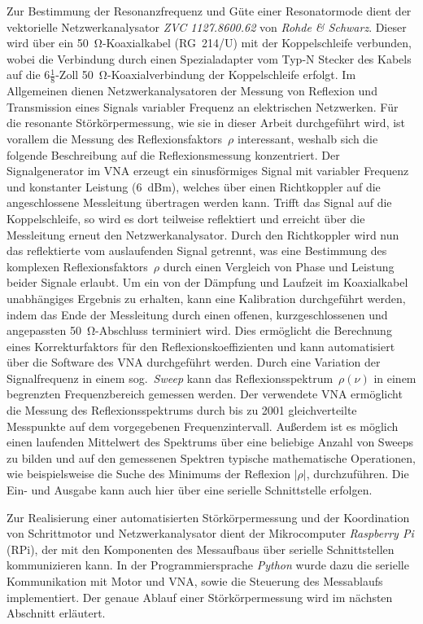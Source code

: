 Zur Bestimmung der Resonanzfrequenz und Güte einer Resonatormode dient der vektorielle Netzwerkanalysator \textit{ZVC 1127.8600.62} von \textit{Rohde \& Schwarz}.
Dieser wird über ein \SI{50}{\ohm}-Koaxialkabel (RG~214/U) mit der Koppelschleife verbunden, wobei die Verbindung durch einen Spezialadapter vom Typ-N Stecker des Kabels auf die $6\tfrac{1}{8}$-Zoll \SI{50}{\ohm}-Koaxialverbindung der Koppelschleife erfolgt.
Im Allgemeinen dienen Netzwerkanalysatoren der Messung von Reflexion und Transmission eines Signals variabler Frequenz an elektrischen Netzwerken.
Für die resonante Störkörpermessung, wie sie in dieser Arbeit durchgeführt wird, ist vorallem die Messung des Reflexionsfaktors~$\rho$ interessant, weshalb sich die folgende Beschreibung auf die Reflexionsmessung konzentriert.
Der Signalgenerator im VNA erzeugt ein sinusförmiges Signal mit variabler Frequenz und konstanter Leistung (\SI{6}{dBm}), welches über einen Richtkoppler auf die angeschlossene Messleitung übertragen werden kann.
Trifft das Signal auf die Koppelschleife, so wird es dort teilweise reflektiert und erreicht über die Messleitung erneut den Netzwerkanalysator.
Durch den Richtkoppler wird nun das reflektierte vom auslaufenden Signal getrennt, was eine Bestimmung des komplexen Reflexionsfaktors~$\rho$ durch einen Vergleich von Phase und Leistung beider Signale erlaubt.
Um ein von der Dämpfung und Laufzeit im Koaxialkabel unabhängiges Ergebnis zu erhalten, kann eine Kalibration durchgeführt werden, indem das Ende der Messleitung durch einen offenen, kurzgeschlossenen und angepassten \SI{50}{\ohm}-Abschluss terminiert wird.
Dies ermöglicht die Berechnung eines Korrekturfaktors für den Reflexionskoeffizienten und kann automatisiert über die Software des VNA durchgeführt werden.
Durch eine Variation der Signalfrequenz in einem sog.\ \textit{Sweep} kann das Reflexionsspektrum~$\rho(\nu)$ in einem begrenzten Frequenzbereich gemessen werden.
Der verwendete VNA ermöglicht die Messung des Reflexionsspektrums durch bis zu 2001 gleichverteilte Messpunkte auf dem vorgegebenen Frequenzintervall.
Außerdem ist es möglich einen laufenden Mittelwert des Spektrums über eine beliebige Anzahl von Sweeps zu bilden und auf den gemessenen Spektren typische mathematische Operationen, wie beispielsweise die Suche des Minimums der Reflexion $|\rho|$, durchzuführen.
Die Ein- und Ausgabe kann auch hier über eine serielle Schnittstelle erfolgen.

Zur Realisierung einer automatisierten Störkörpermessung und der Koordination von Schrittmotor und Netzwerkanalysator dient der Mikrocomputer \textit{Raspberry Pi} (RPi), der mit den Komponenten des Messaufbaus über serielle Schnittstellen kommunizieren kann.
In der Programmiersprache \textit{Python} wurde dazu die serielle Kommunikation mit Motor und VNA, sowie die Steuerung des Messablaufs implementiert.
Der genaue Ablauf einer Störkörpermessung wird im nächsten Abschnitt erläutert.


